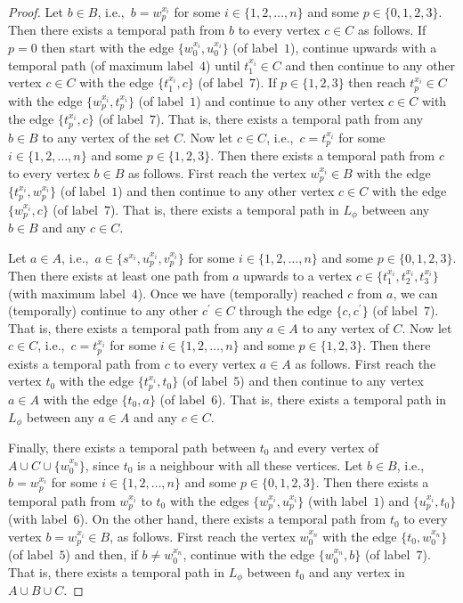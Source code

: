 \documentclass[a4paper,UKenglish]{article}
\begin{document}
\begin{proof}
Let $b\in B$, i.e.,~$b=w_{p}^{x_{i}}$ for some $i\in \{1,2,\ldots ,n\}$ and
some $p\in \{0,1,2,3\}$. Then there exists a temporal path from $b$ to every
vertex $c\in C$ as follows. If $p=0$ then start with the edge $\{ w_{0}^{x_{i}} , u_{0}^{x_{i}}  \} $ (of label~$1$), continue upwards with a temporal
path (of maximum label~$4$) until $t_{1}^{x_{i}}\in C$ and then continue to
any other vertex $c\in C$ with the edge $  \{ t_{1}^{x_{i}} , c \} $ (of label~$7$). If $p\in \{1,2,3\}$ then reach $t_{p}^{x_{i}}\in C$ with the edge $\{ w_{p}^{x_{i}}  ,  t_{p}^{x_{i}}  \} $ (of label~$1$) and continue to any other vertex $c\in C$ with the edge $ \{  t_{p}^{x_{i}} , c  \}  $ (of label~$7$). That is, there exists
a temporal path from any $b\in B$ to any vertex of the set $C$. Now let $c\in C$, i.e.,~$c=t_{p}^{x_{i}}$ for some $i\in \{1,2,\ldots ,n\}$ and some $p\in \{1,2,3\}$. Then there exists a temporal path from $c$ to every vertex $b\in B$ as follows. First reach the vertex $w_{p}^{x_{i}}\in B$ with the
edge $ \{ t_{p}^{x_{i}}  ,  w_{p}^{x_{i}}  \} $ (of label~$1$) and then continue to any
other vertex $c\in C$ with the edge $  \{ w_{p}^{x_{i}}  ,  c  \} $ (of label~$7$). That
is, there exists a temporal path in $L _{\phi }$ between any $b\in B$
and any $c\in C$.

Let $a\in A$, i.e.,~$a\in \{s^{x_{i}},u_{p}^{x_{i}},v_{p}^{x_{i}}\}$ for some 
$i\in \{1,2,\ldots ,n\}$ and some $p\in \{0,1,2,3\}$. Then there exists at
least one path from $a$ upwards to a vertex $c\in
\{t_{1}^{x_{i}},t_{2}^{x_{i}},t_{3}^{x_{i}}\}$ (with maximum label~$4$).
Once we have (temporally) reached $c$ from $a$, we can (temporally) continue
to any other $c^{\prime }\in C$ through the edge $\{ c , c^{\prime } \} $ (of label~$7$). That is, there exists a temporal path from any $a\in A$ to any vertex of $C$. Now let $c\in C$, i.e.,~$c=t_{p}^{x_{i}}$ for some $i\in \{1,2,\ldots
,n\} $ and some $p\in \{1,2,3\}$. Then there exists a temporal path from $c$
to every vertex $a\in A$ as follows. First reach the vertex $t_{0}$ with the
edge $ \{  t_{p}^{x_{i}}  ,  t_{0}  \}$ (of label~$5$) and then continue to any vertex $a\in A$ with the edge $ \{  t_{0} , a \}$ (of label~$6$). That is, there exists a
temporal path in $L _{\phi }$ between any $a\in A$ and any $c\in C$.

Finally, there exists a temporal path between $t_{0}$ and every vertex of $A\cup C\cup \{w_{0}^{x_{n}}\}$, since $t_{0}$ is a neighbour with all these
vertices. Let $b\in B$, i.e.,~$b=w_{p}^{x_{i}}$ for some $i\in \{1,2,\ldots
,n\}$ and some $p\in \{0,1,2,3\}$. Then there exists a temporal path from $w_{p}^{x_{i}}$ to $t_{0}$ with the edges $ \{ w_{p}^{x_{i}}  ,  u_{p}^{x_{i}}   \}  $ (with
label~$1$) and $   \{  u_{p}^{x_{i}}  ,  t_{0}  \}  $ (with label~$6$). On the other hand,
there exists a temporal path from $t_{0}$ to every vertex $b=w_{p}^{x_{i}}\in B$, as follows. First reach the vertex $w_{0}^{x_{n}}$
with the edge $  \{  t_{0}  ,  w_{0}^{x_{n}}  \}  $ (of label~$5$) and then, if $b\neq
w_{0}^{x_{n}}$, continue with the edge $  \{  w_{0}^{x_{n}}  ,  b  \}  $ (of label~$7$). That
is, there exists a temporal path in $L _{\phi }$ between $t_{0}$ and
any vertex in $A\cup B\cup C$.


\end{proof}
\end{document}
